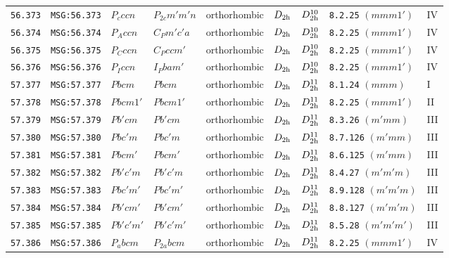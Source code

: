 \documentclass[fleqn,10pt]{jsarticle}
\begin{document}
\begin{center}
\begin{longtable}{lllllllll}
\texttt{56.373} & \texttt{MSG:56.373} & $P_{c}ccn$ & $P_{2c}m'm'n$ & orthorhombic & $D_{\rm 2h}$ & $D_{\rm 2h}^{10}$ & \texttt{8.2.25} $(mmm1')$ & IV \\
\texttt{56.374} & \texttt{MSG:56.374} & $P_{A}ccn$ & $C_{P}m'c'a$ & orthorhombic & $D_{\rm 2h}$ & $D_{\rm 2h}^{10}$ & \texttt{8.2.25} $(mmm1')$ & IV \\
\texttt{56.375} & \texttt{MSG:56.375} & $P_{C}ccn$ & $C_{P}ccm'$ & orthorhombic & $D_{\rm 2h}$ & $D_{\rm 2h}^{10}$ & \texttt{8.2.25} $(mmm1')$ & IV \\
\texttt{56.376} & \texttt{MSG:56.376} & $P_{I}ccn$ & $I_{P}bam'$ & orthorhombic & $D_{\rm 2h}$ & $D_{\rm 2h}^{10}$ & \texttt{8.2.25} $(mmm1')$ & IV \\ \hline
\texttt{57.377} & \texttt{MSG:57.377} & $Pbcm$ & $Pbcm$ & orthorhombic & $D_{\rm 2h}$ & $D_{\rm 2h}^{11}$ & \texttt{8.1.24} $(mmm)$ & I \\
\texttt{57.378} & \texttt{MSG:57.378} & $Pbcm1'$ & $Pbcm1'$ & orthorhombic & $D_{\rm 2h}$ & $D_{\rm 2h}^{11}$ & \texttt{8.2.25} $(mmm1')$ & II \\
\texttt{57.379} & \texttt{MSG:57.379} & $Pb'cm$ & $Pb'cm$ & orthorhombic & $D_{\rm 2h}$ & $D_{\rm 2h}^{11}$ & \texttt{8.3.26} $(m'mm)$ & III \\
\texttt{57.380} & \texttt{MSG:57.380} & $Pbc'm$ & $Pbc'm$ & orthorhombic & $D_{\rm 2h}$ & $D_{\rm 2h}^{11}$ & \texttt{8.7.126} $(m'mm)$ & III \\
\texttt{57.381} & \texttt{MSG:57.381} & $Pbcm'$ & $Pbcm'$ & orthorhombic & $D_{\rm 2h}$ & $D_{\rm 2h}^{11}$ & \texttt{8.6.125} $(m'mm)$ & III \\
\texttt{57.382} & \texttt{MSG:57.382} & $Pb'c'm$ & $Pb'c'm$ & orthorhombic & $D_{\rm 2h}$ & $D_{\rm 2h}^{11}$ & \texttt{8.4.27} $(m'm'm)$ & III \\
\texttt{57.383} & \texttt{MSG:57.383} & $Pbc'm'$ & $Pbc'm'$ & orthorhombic & $D_{\rm 2h}$ & $D_{\rm 2h}^{11}$ & \texttt{8.9.128} $(m'm'm)$ & III \\
\texttt{57.384} & \texttt{MSG:57.384} & $Pb'cm'$ & $Pb'cm'$ & orthorhombic & $D_{\rm 2h}$ & $D_{\rm 2h}^{11}$ & \texttt{8.8.127} $(m'm'm)$ & III \\
\texttt{57.385} & \texttt{MSG:57.385} & $Pb'c'm'$ & $Pb'c'm'$ & orthorhombic & $D_{\rm 2h}$ & $D_{\rm 2h}^{11}$ & \texttt{8.5.28} $(m'm'm')$ & III \\
\texttt{57.386} & \texttt{MSG:57.386} & $P_{a}bcm$ & $P_{2a}bcm$ & orthorhombic & $D_{\rm 2h}$ & $D_{\rm 2h}^{11}$ & \texttt{8.2.25} $(mmm1')$ & IV \\

\end{longtable}
\end{center}
\end{document}
